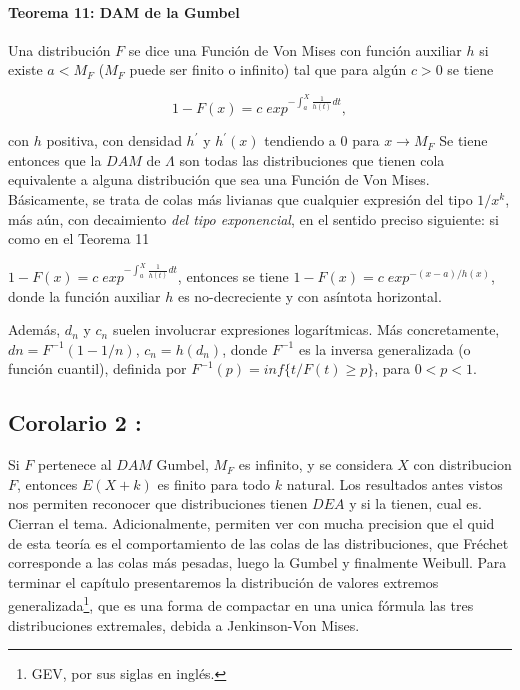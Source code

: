 \documentclass[
  oneside]{book}
\begin{document}
\hypertarget{teorema-11-dam-de-la-gumbel}{%
\paragraph{Teorema 11: DAM de la
Gumbel}\label{teorema-11-dam-de-la-gumbel}}

Una distribución \(F\) se dice una Función de Von Mises con función
auxiliar \(h\) si existe \(a < M_F\) (\(M_F\) puede ser finito o
infinito) tal que para algún \(c>0\) se tiene

\[
1-F(x)= c\;exp^{{- \int_a^X \frac{1}{h(t)} dt}},
\]

con \(h\) positiva, con densidad \(h^\prime\) y \(h^\prime(x)\)
tendiendo a \(0\) para \(x\rightarrow M_F\) Se tiene entonces que la
\(DAM\) de \(\Lambda\) son todas las distribuciones que tienen cola
equivalente a alguna distribución que sea una Función de Von Mises.
Básicamente, se trata de colas más livianas que cualquier expresión del
tipo \(1/x^k\), más aún, con decaimiento \textit{del tipo exponencial},
en el sentido preciso siguiente: si como en el Teorema 11

\(1-F(x)= c\;exp^{{- \int_a^X \frac{1}{h(t)} dt}}\), entonces se tiene
\(1-F(x)= c\;exp^{-(x-a)/h(x)}\), donde la función auxiliar \(h\) es
no-decreciente y con asíntota horizontal.

Además, \(d_n\) y \(c_n\) suelen involucrar expresiones logarítmicas.
Más concretamente, \(dn = F^{-1}(1-1/n)\), \(c_n = h(d_n)\), donde
\(F^{-1}\) es la inversa generalizada (o función cuantil), definida por
\(F^{-1}(p)= inf\{t / F(t)\geq p\}\), para \(0<p<1\).

\hypertarget{corolario-2}{%
\subsection{Corolario 2 :}\label{corolario-2}}

Si \(F\) pertenece al \(DAM\) Gumbel, \(M_F\) es infinito, y se
considera \(X\) con distribucion \(F\), entonces \(E(X+k)\) es finito
para todo \(k\) natural. Los resultados antes vistos nos permiten
reconocer que distribuciones tienen \(DEA\) y si la tienen, cual es.
Cierran el tema. Adicionalmente, permiten ver con mucha precision que el
quid de esta teoría es el comportamiento de las colas de las
distribuciones, que Fréchet corresponde a las colas más pesadas, luego
la Gumbel y finalmente Weibull. Para terminar el capítulo presentaremos
la distribución de valores extremos
generalizada\footnote{GEV, por sus siglas en inglés.}, que es una forma
de compactar en una unica fórmula las tres distribuciones extremales,
debida a Jenkinson-Von Mises.
\end{document}
